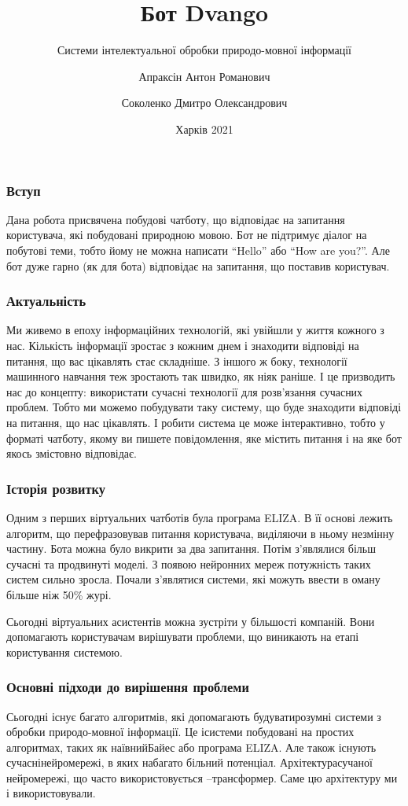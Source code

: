 \documentclass{beamer}
\title{Бот Dvango}
\subtitle{Системи інтелектуальної обробки природо-мовної інформації}
\author[shortname]{Апраксін Антон Романович \\ \and Соколенко Дмитро Олександрович}
\institute{ІТШІ-18-1}
\date{Харків 2021}
\begin{document}
    \frame{\titlepage}

    \begin{frame}
        \frametitle{Вступ}
            Дана робота присвячена побудові чатботу, що відповідає на запитання користувача, які побудовані природною мовою. Бот не підтримує діалог на побутові теми, тобто йому не можна написати ``Hello'' або ``How are you?''. Але бот дуже гарно (як для бота) відповідає на запитання, що поставив користувач.
    \end{frame}

    \begin{frame}
        \frametitle{Актуальність}
    Ми живемо в епоху інформаційних технологій, які увійшли у життя кожного з нас. Кількість інформації зростає з кожним днем і знаходити відповіді на питання, що вас цікавлять стає складніше. З іншого ж боку, технології машинного навчання теж зростають так швидко, як ніяк раніше. І це призводить нас до концепту: використати сучасні технології для розв'язання сучасних проблем. Тобто ми можемо побудувати таку систему, що буде знаходити відповіді на питання, що нас цікавлять. І робити система це може інтерактивно, тобто у форматі чатботу, якому ви пишете повідомлення, яке містить питання і на яке бот якось змістовно відповідає.
    \end{frame}

    \begin{frame}
        \frametitle{Історія розвитку}
        Одним з перших віртуальних чатботів була програма ELIZA. В її основі лежить алгоритм, що перефразовував питання користувача, виділяючи в ньому незмінну частину. Бота можна було викрити за два запитання. Потім з'являлися більш сучасні та продвинуті моделі. З появою нейронних мереж потужність таких систем сильно зросла. Почали з'являтися системи, які можуть ввести в оману більше ніж 50\% журі. 

        Сьогодні віртуальних асистентів можна зустріти у більшості компаній. Вони допомагають користувачам вирішувати проблеми, що виникають на етапі користування системою.
    \end{frame}

    \begin{frame}
        \frametitle{Основні підходи до вирішення проблеми}
        Сьогодні існує багато алгоритмів, які допомагають будуватирозумні системи з обробки природо-мовної інформації. Це ісистеми побудовані на простих алгоритмах, таких як наївнийБайес або програма ELIZA. Але також існують сучаснінейромережі, в яких набагато більний потенціал. Архітектурасучаної нейромережі, що часто використовується –трансформер. Саме цю архітектуру ми і використовували.
    \end{frame}
\end{document}
